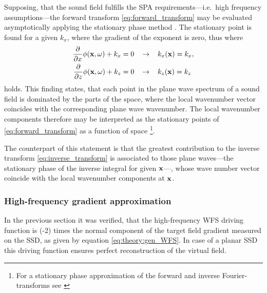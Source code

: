 Supposing, that the sound field fulfills the SPA requirements---i.e.\ high frequency assumptions---the forward transform \eqref{eq:forward_transform}
may be evaluated asymptotically applying the stationary phase method \cite{Arnold1995, Tinkelman2005}.
The stationary point is found for a given $k_x$, where the gradient of the exponent is zero, thus where
\begin{align}
\frac{\partial}{\partial x} \phi(\mathbf{x},\omega) + k_x &= 0 \hspace{3mm} \rightarrow \hspace{3mm} k_x(\mathbf{x}) = k_x, \\
\frac{\partial}{\partial z} \phi(\mathbf{x},\omega) + k_z &= 0 \hspace{3mm} \rightarrow \hspace{3mm} k_z(\mathbf{x}) = k_z
\end{align}
holds.
This finding states, that each point in the plane wave spectrum of a sound field is dominated by the parts of the space, where the local wavenumber vector coincides with the corresponding plane wave wavenumber.
The local wavenumber components therefore may be interpreted as the stationary points of \eqref{eq:forward_transform} as a function of space \footnote{For a stationary phase approximation of the forward and inverse Fourier-transforms see \cite[Eq.\ 5.20, 5.51]{Tracy2014}}.

The counterpart of this statement is that the greatest contribution to the inverse transform \eqref{eq:inverse_transform} is associated to those plane waves---the stationary phase of the inverse integral for given $\mathbf{x}$---, whose wave number vector coincide with the local wavenumber components at $\mathbf{x}$.

\subsubsection{High-frequency gradient approximation}
In the previous section it was verified, that the high-frequency WFS driving function is (-2) times the normal component of the target field gradient measured on the SSD, as given by equation \eqref{eq:theory:gen_WFS}.
In case of a planar SSD this driving function ensures perfect reconstruction of the virtual field.


